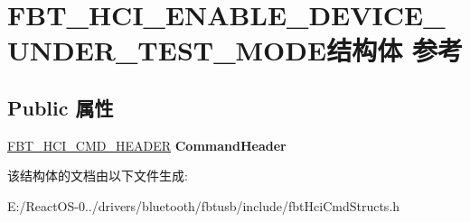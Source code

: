 \hypertarget{struct_f_b_t___h_c_i___e_n_a_b_l_e___d_e_v_i_c_e___u_n_d_e_r___t_e_s_t___m_o_d_e}{}\section{F\+B\+T\+\_\+\+H\+C\+I\+\_\+\+E\+N\+A\+B\+L\+E\+\_\+\+D\+E\+V\+I\+C\+E\+\_\+\+U\+N\+D\+E\+R\+\_\+\+T\+E\+S\+T\+\_\+\+M\+O\+D\+E结构体 参考}
\label{struct_f_b_t___h_c_i___e_n_a_b_l_e___d_e_v_i_c_e___u_n_d_e_r___t_e_s_t___m_o_d_e}
\subsection*{Public 属性}
\begin{DoxyCompactItemize}
\item 
\mbox{\label{struct_f_b_t___h_c_i___e_n_a_b_l_e___d_e_v_i_c_e___u_n_d_e_r___t_e_s_t___m_o_d_e_a6948289cc4de3bd5a08e2cb2b160e8be}} 
\hyperlink{struct_f_b_t___h_c_i___c_m_d___h_e_a_d_e_r}{F\+B\+T\+\_\+\+H\+C\+I\+\_\+\+C\+M\+D\+\_\+\+H\+E\+A\+D\+ER} {\bfseries Command\+Header}
\end{DoxyCompactItemize}


该结构体的文档由以下文件生成\+:\begin{DoxyCompactItemize}
\item 
E\+:/\+React\+O\+S-\/0../drivers/bluetooth/fbtusb/include/fbt\+Hci\+Cmd\+Structs.\+h\end{DoxyCompactItemize}

